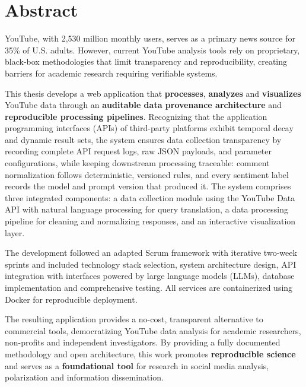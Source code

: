 \chapter{Abstract}

YouTube, with 2,530 million monthly users, serves as a primary news source for 35\% of U.S. adults. However, current YouTube analysis tools rely on proprietary, black-box methodologies that limit transparency and reproducibility, creating barriers for academic research requiring verifiable systems.

This thesis develops a web application that \textbf{processes}, \textbf{analyzes} and \textbf{visualizes} YouTube data through an \textbf{auditable data provenance architecture} and \textbf{reproducible processing pipelines}. Recognizing that the application programming interfaces (APIs) of third-party platforms exhibit temporal decay and dynamic result sets, the system ensures data collection transparency by recording complete API request logs, raw JSON payloads, and parameter configurations, while keeping downstream processing traceable: comment normalization follows deterministic, versioned rules, and every sentiment label records the model and prompt version that produced it. The system comprises three integrated components: a data collection module using the YouTube Data API with natural language processing for query translation, a data processing pipeline for cleaning and normalizing responses, and an interactive visualization layer.

The development followed an adapted Scrum framework with iterative two-week sprints and included technology stack selection, system architecture design, API integration with interfaces powered by large language models (LLMs), database implementation and comprehensive testing. All services are containerized using Docker for reproducible deployment.

The resulting application provides a no-cost, transparent alternative to commercial tools, democratizing YouTube data analysis for academic researchers, non-profits and independent investigators. By providing a fully documented methodology and open architecture, this work promotes \textbf{reproducible science} and serves as a \textbf{foundational tool} for research in social media analysis, polarization and information dissemination.
